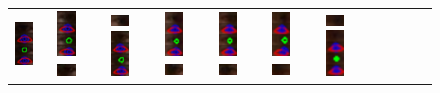 \begin{figure}
\begin{tabular}{|c|c|c|c|c|c|c|c|c|c|c|c|}
		\includegraphics[width=0.48cm]{img_Versuch_Auge/Auge_10}&
		\includegraphics[width=0.48cm]{img_Versuch_Auge/Auge_11}
		\includegraphics[width=0.48cm]{img_Versuch_Auge/Auge_12}&
		\includegraphics[width=0.48cm]{img_Versuch_Auge/Auge_13}
		\includegraphics[width=0.48cm]{img_Versuch_Auge/Auge_14}&
		\includegraphics[width=0.48cm]{img_Versuch_Auge/Auge_15}
		\includegraphics[width=0.48cm]{img_Versuch_Auge/Auge_16}&
		\includegraphics[width=0.48cm]{img_Versuch_Auge/Auge_17}
		\includegraphics[width=0.48cm]{img_Versuch_Auge/Auge_18}&
		\includegraphics[width=0.48cm]{img_Versuch_Auge/Auge_19}
		\includegraphics[width=0.48cm]{img_Versuch_Auge/Auge_20}&
		\includegraphics[width=0.48cm]{img_Versuch_Auge/Auge_21}
		\includegraphics[width=0.48cm]{img_Versuch_Auge/Auge_22}&

\end{tabular}
\end{figure}
